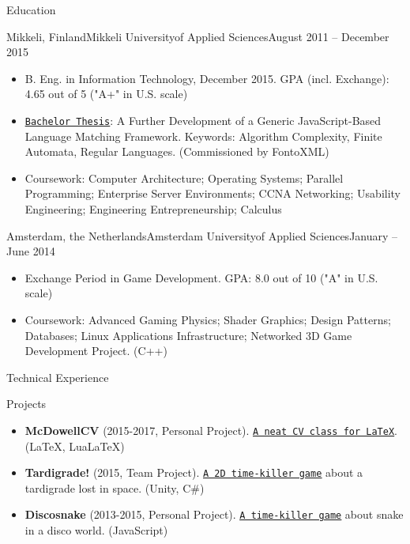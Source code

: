 \documentclass[calibri]{mcdowellcv}
\newcommand{\ultthref}[2]{\href{#1}{\underline{\texttt{#2}}}}
\begin{document}
	\begin{cvsection}{Education}
		\begin{cvsubsection}[2]{Mikkeli, Finland}{Mikkeli University\linebreak of Applied Sciences}{August 2011 -- December 2015}	
			\begin{itemize}
				\item B. Eng. in Information Technology, December 2015. GPA (incl. Exchange): 4.65 out of 5 ("A+" in U.S. scale)
				\item \ultthref{http://urn.fi/URN:NBN:fi:amk-2015120118713}{Bachelor Thesis}: A Further Development of a Generic JavaScript-Based Language Matching Framework. Keywords: Algorithm Complexity, Finite Automata, Regular Languages. (Commissioned by FontoXML)
				\item Coursework: Computer Architecture; Operating Systems; Parallel Programming; Enterprise Server Environments; CCNA Networking; Usability Engineering; Engineering Entrepreneurship; Calculus
			\end{itemize}
		\end{cvsubsection}
		
		\begin{cvsubsection}[2]{Amsterdam, the Netherlands}{Amsterdam University\linebreak of Applied Sciences}{January -- June 2014}
			\begin{itemize}
				\item Exchange Period in Game Development. GPA: 8.0 out of 10 ("A" in U.S. scale)
				\item Coursework: Advanced Gaming Physics; Shader Graphics; Design Patterns; Databases; Linux Applications Infrastructure; Networked 3D Game Development Project. (C++)
			\end{itemize}
		\end{cvsubsection}
	\end{cvsection}
	
	\begin{cvsection}{Technical Experience}	
		\begin{cvsubsection}{Projects}{}{}
			\begin{itemize}
				\item \textbf{McDowellCV} (2015-2017, Personal Project). \ultthref{https://github.com/dnl-blkv/mcdowell-cv}{A neat CV class for LaTeX}. (LaTeX, LuaLaTeX)
				\item \textbf{Tardigrade!} (2015, Team Project). \ultthref{http://playtardi.com/}{A 2D time-killer game} about a tardigrade lost in space. (Unity, C\#)
				\item \textbf{Discosnake} (2013-2015, Personal Project). \ultthref{http://discosnake.com/}{A time-killer game} about snake in a disco world. (JavaScript)
			\end{itemize}
		\end{cvsubsection}
	\end{cvsection}
\end{document}

